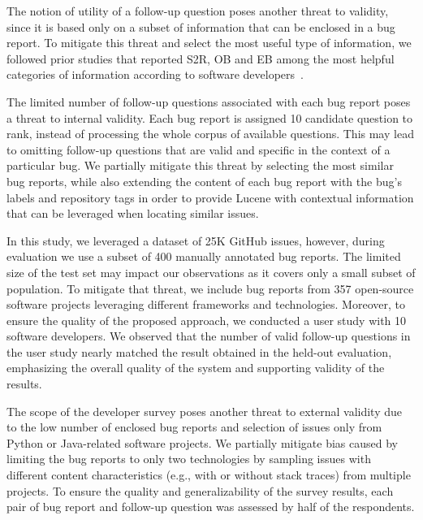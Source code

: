 The notion of utility of a follow-up question poses another threat to validity, since it is based only on a subset of information that can be enclosed in a bug report. To mitigate this threat and select the most useful type of information, we followed prior studies that reported S2R, OB and EB among the most helpful categories of information according to software developers~\cite{Zimmermann2010}.



The limited number of follow-up questions associated with each bug report poses a threat to internal validity. Each bug report is assigned 10 candidate question to rank, instead of processing the whole corpus of available questions. This  may lead to omitting follow-up questions that are valid and specific in the context of a particular bug. We partially mitigate this threat by selecting the most similar bug reports, while also extending the content of each bug report with the bug's labels and repository tags in order to provide Lucene with contextual information that can be leveraged when locating similar issues.


In this study, we leveraged a dataset of 25K GitHub issues, however, during evaluation we use a subset of 400 manually annotated bug reports. The limited size of the test set may impact our observations as it covers only a small subset of population. To mitigate that threat, we include bug reports from 357 open-source software projects leveraging different frameworks and technologies. Moreover, to ensure the quality of the proposed approach, we conducted a user study with 10 software developers. We observed that the number of valid follow-up questions in the user study nearly matched the result obtained in the held-out evaluation, emphasizing the overall quality of the system and supporting validity of the results.

The scope of the developer survey poses another threat to external validity due to the low number of enclosed bug reports and selection of issues only from Python or Java-related software projects. We partially mitigate bias caused by limiting the bug reports to only two technologies by sampling issues with different content characteristics (e.g., with or without stack traces) from multiple projects.  To ensure the quality and generalizability of the survey results, each pair of bug report and follow-up question was assessed by half of the respondents.
